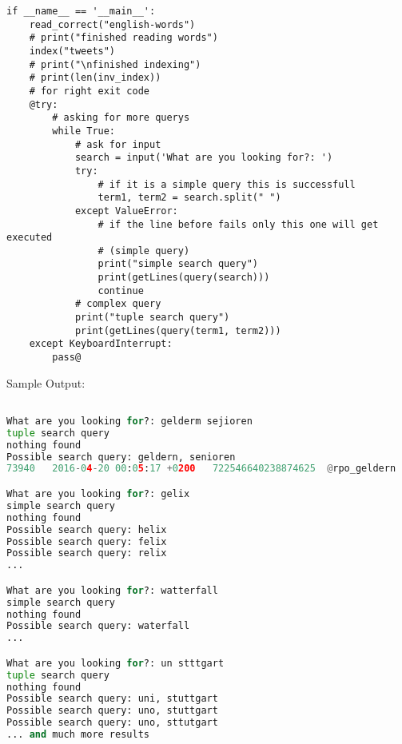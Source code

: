 \documentclass[12pt,pdftex,a4paper]{article}
\begin{document}
\begin{lstlisting}[style=base]
if __name__ == '__main__':
    read_correct("english-words")
    # print("finished reading words")
    index("tweets")
    # print("\nfinished indexing")
    # print(len(inv_index))
    # for right exit code
    @try:
        # asking for more querys
        while True:
            # ask for input
            search = input('What are you looking for?: ')
            try:
                # if it is a simple query this is successfull
                term1, term2 = search.split(" ")
            except ValueError:
                # if the line before fails only this one will get executed
                # (simple query)
                print("simple search query")
                print(getLines(query(search)))
                continue
            # complex query
            print("tuple search query")
            print(getLines(query(term1, term2)))
    except KeyboardInterrupt:
        pass@

\end{lstlisting}

Sample Output:
\begin{lstlisting}[language=Python,style=output]

What are you looking for?: gelderm sejioren
tuple search query
nothing found
Possible search query: geldern, senioren
73940	2016-04-20 00:05:17 +0200	722546640238874625	@rpo_geldern	RP Online Geldern	Geldern - Senioren machen eine Reise zurück in die Kinderzeit https://t.co/57qoWYf6LO

What are you looking for?: gelix
simple search query
nothing found
Possible search query: helix
Possible search query: felix
Possible search query: relix
...

What are you looking for?: watterfall
simple search query
nothing found
Possible search query: waterfall
...

What are you looking for?: un stttgart
tuple search query
nothing found
Possible search query: uni, stuttgart
Possible search query: uno, stuttgart
Possible search query: uno, sttutgart
... and much more results


\end{lstlisting}
\end{document}
